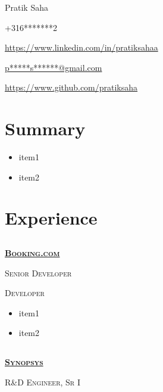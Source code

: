 \documentclass{article}
\begin{document}
\begin{center}\selectfont\Large Pratik Saha\end{center}
{\raggedright \Mobilefone +316*******2} \hfill { \raggedleft \faLinkedin \href{https://www.linkedin.com/in/pratiksaha}{https://www.linkedin.com/in/pratiksahaa}   }

{\raggedright {} \href{mailto:p*****s******@gmail.com}{p*****s******@gmail.com}} \hfill { \raggedleft \faGithub \href{https://www.github.com/pratiksaha}{https://www.github.com/pratiksaha} }

\section{Summary}
\begin{itemize}[noitemsep,nolistsep]
	\item item1
	\item item2
\end{itemize}

\section{Experience}
\subsection[Booking.com]{}
{\raggedright{\textsc{\textbf{\href{https://www.booking.com/}{Booking.com}}}}} \hfill {}

{\raggedright{\textsc{Senior Developer}}} \hfill {}

{\raggedright{\textsc{Developer}}} \hfill {}

\begin{itemize}[noitemsep,nolistsep]
\item item1
\item item2
\end{itemize}

\subsection[Synopsys]{}

{\raggedright{\textsc{\textbf{\href{https://www.synopsys.com/}{Synopsys}}}}} \hfill {}

{\raggedright{\textsc{R\&D Engineer, Sr I}}} \hfill {}
\end{document}
